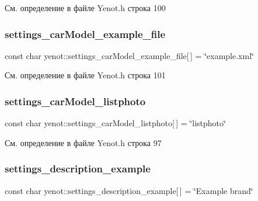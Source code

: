 См. определение в файле Yenot.\+h строка 100

\mbox{\label{namespaceyenot_acd910e59eb17aa18802af8f4544aab48}} 
\subsubsection{\texorpdfstring{settings\+\_\+car\+Model\+\_\+example\+\_\+file}{settings\_carModel\_example\_file}}
{\footnotesize\ttfamily const char yenot\+::settings\+\_\+car\+Model\+\_\+example\+\_\+file\mbox{[}$\,$\mbox{]} = \char`\"{}example.\+xml\char`\"{}}



См. определение в файле Yenot.\+h строка 101

\mbox{\label{namespaceyenot_a0a2414e62514c20e76cf0c522ebf38a3}} 
\subsubsection{\texorpdfstring{settings\+\_\+car\+Model\+\_\+listphoto}{settings\_carModel\_listphoto}}
{\footnotesize\ttfamily const char yenot\+::settings\+\_\+car\+Model\+\_\+listphoto\mbox{[}$\,$\mbox{]} = \char`\"{}listphoto\char`\"{}}



См. определение в файле Yenot.\+h строка 97

\mbox{\label{namespaceyenot_a37f90b0081fe0617055470d46489ea0f}} 
\subsubsection{\texorpdfstring{settings\+\_\+description\+\_\+example}{settings\_description\_example}}
{\footnotesize\ttfamily const char yenot\+::settings\+\_\+description\+\_\+example\mbox{[}$\,$\mbox{]} = \char`\"{}Example brand\char`\"{}}



